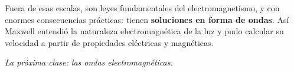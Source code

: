 \documentclass[12pt,a4paper]{article}
\begin{document}
Fuera de esas escalas, son leyes fundamentales del electromagnetismo, y con
enormes consecuencias prácticas: tienen \textbf{soluciones en forma de ondas}. Así
Maxwell entendió la naturaleza electromagnética de la luz y pudo calcular su
velocidad a partir de propiedades eléctricas y magnéticas.

\noindent\emph{La próxima clase: las ondas electromagnéticas.}
\end{document}
